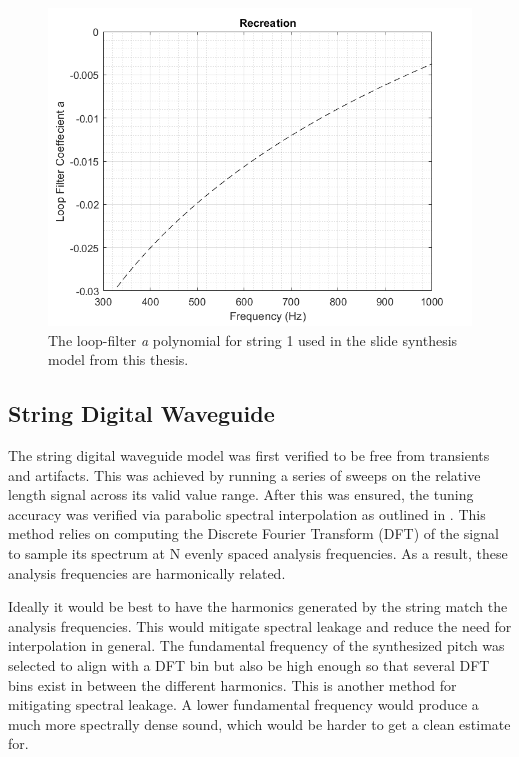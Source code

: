 \documentclass[../main.tex]{subfiles}
\begin{document}
\begin{figure}[h!]
    \centering
    \includegraphics[scale=.65]{./images/plots/Figure19Recon.png}
    \caption{The loop-filter \emph{a} polynomial for string 1 used in the slide synthesis model from this thesis.}
    \label{fig:Fig19Recon}
\end{figure}

\clearpage

\subsection{String Digital Waveguide}
The string digital waveguide model was first verified to be free from transients and artifacts. This was achieved by running a series of sweeps on the relative length signal across its valid value range. After this was ensured, the tuning accuracy was verified via parabolic spectral interpolation as outlined in . This method relies on computing the Discrete Fourier Transform (DFT) of the signal to sample its spectrum at N evenly spaced analysis frequencies. As a result, these analysis frequencies are harmonically related.

Ideally it would be best to have the harmonics generated by the string match the analysis frequencies. This would mitigate spectral leakage and reduce the need for interpolation in general. The fundamental frequency of the synthesized pitch was selected to align with a DFT bin but also be high enough so that several DFT bins exist in between the different harmonics. This is another method for mitigating spectral leakage. A lower fundamental frequency would produce a much more spectrally dense sound, which would be harder to get a clean estimate for.
\end{document}

